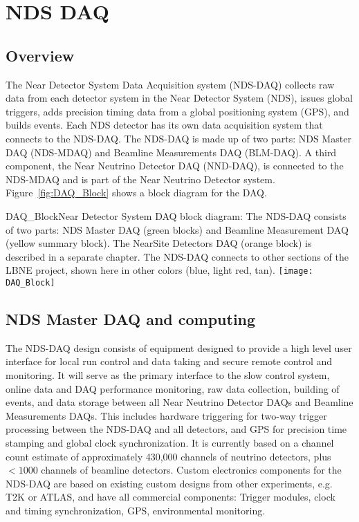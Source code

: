 \section{NDS DAQ}

\subsection{Overview}

The Near Detector System 
Data Acquisition system (NDS-DAQ) collects raw data from each detector 
system in the Near Detector System (NDS), issues global triggers, adds precision timing 
data from a global positioning system (GPS), and builds events. Each NDS detector has its 
own data acquisition system that connects to the NDS-DAQ.
The NDS-DAQ is made up of two parts: NDS Master DAQ (NDS-MDAQ) and Beamline Measurements 
DAQ (BLM-DAQ). A third component, the Near Neutrino Detector DAQ (NND-DAQ), is 
connected to the NDS-MDAQ and is part of the Near Neutrino Detector system.
Figure~\ref{fig:DAQ_Block} shows a block diagram for the DAQ.

\begin{cdrfigure}{DAQ_Block}{Near Detector System DAQ block diagram: The NDS-DAQ consists 
of two parts: NDS Master DAQ (green blocks) and Beamline Measurement DAQ (yellow summary 
block). The NearSite Detectors DAQ (orange block) is described in a separate chapter. The 
NDS-DAQ connects to other sections of the LBNE project, shown here in other colors (blue, 
light red, tan).}
\texttt{[image: DAQ\_Block]}
\end{cdrfigure}


\subsection{NDS Master DAQ and computing}

The NDS-DAQ design consists of equipment designed to provide a high level user interface 
for local run control and data taking and secure remote control and monitoring.   It will 
serve as the primary interface to the slow control system, online data and DAQ performance 
monitoring, raw data collection, building of events, and data storage between all Near 
Neutrino Detector DAQs and Beamline Measurements DAQs.  This includes hardware triggering 
for two-way trigger processing between the NDS-DAQ and all detectors, and GPS for precision 
time stamping and global clock synchronization.  It is currently based on a channel count 
estimate of approximately 430,000 channels of neutrino detectors, plus $<1000$ channels of 
beamline detectors.  Custom electronics components for the NDS-DAQ are based on existing 
custom designs from other experiments, e.g. T2K or ATLAS, and have all commercial 
components:  Trigger modules, clock and timing synchronization, GPS, environmental 
monitoring.

